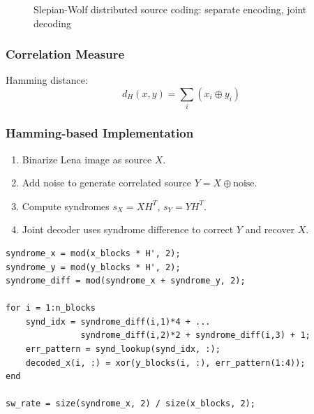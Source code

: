 \documentclass[12pt, a4paper]{article}
\begin{document}
\begin{figure}[h]
\centering
{}
\caption{Slepian-Wolf distributed source coding: separate encoding, joint decoding}
\label{fig:sw_arch_en}
\end{figure}

\subsubsection{Correlation Measure}

Hamming distance:
\begin{equation}
d_H(x,y) = \sum_i (x_i \oplus y_i)
\label{eq:hamming_dist_en}
\end{equation}

\subsubsection{Hamming-based Implementation}

\begin{enumerate}
    \item Binarize Lena image as source $X$.
    \item Add noise to generate correlated source $Y = X \oplus \text{noise}$.
    \item Compute syndromes $s_X = XH^T$, $s_Y = YH^T$.
    \item Joint decoder uses syndrome difference to correct $Y$ and recover $X$.
\end{enumerate}

\begin{lstlisting}[caption=DSC with Hamming codes]
syndrome_x = mod(x_blocks * H', 2);
syndrome_y = mod(y_blocks * H', 2);
syndrome_diff = mod(syndrome_x + syndrome_y, 2);

for i = 1:n_blocks
    synd_idx = syndrome_diff(i,1)*4 + ...
               syndrome_diff(i,2)*2 + syndrome_diff(i,3) + 1;
    err_pattern = synd_lookup(synd_idx, :);
    decoded_x(i, :) = xor(y_blocks(i, :), err_pattern(1:4));
end

sw_rate = size(syndrome_x, 2) / size(x_blocks, 2);
\end{lstlisting}
\end{document}
